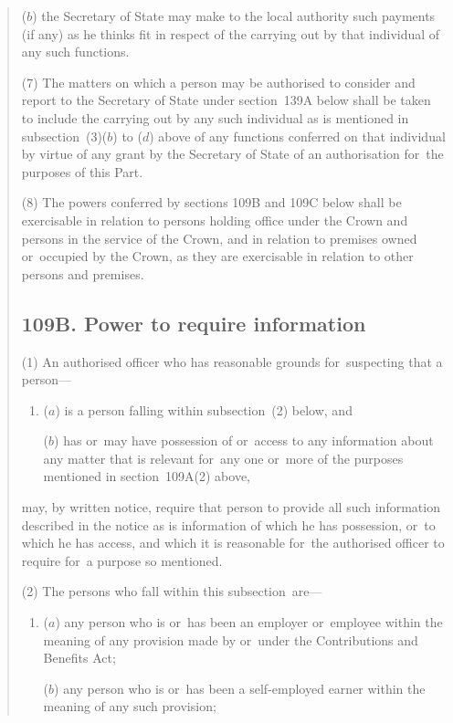 \documentclass[12pt,a4paper]{article}
\begin{document}
\begin{quotation}
\begin{enumerate}
($b$) the Secretary of State may make to the local authority such payments (if any) as he thinks fit in respect of the carrying out by that individual of any such functions.
\end{enumerate}

(7) The matters on which a person may be authorised to consider and report to the Secretary of State under section~139A below shall be taken to include the carrying out by any such individual as is mentioned in subsection~(3)($b$)  to ($d$)  above of any functions conferred on that individual by virtue of any grant by the Secretary of State of an authorisation for~the purposes of this Part.

(8) The powers conferred by sections 109B and 109C below shall be exercisable in relation to persons holding office under the Crown and persons in the service of the Crown, and in relation to premises owned or~occupied by the Crown, as they are exercisable in relation to other persons and premises.

\subsection*{109B. Power to require information}

(1) An authorised officer who has reasonable grounds for~suspecting that a person—
\begin{enumerate}\item[]
($a$) is a person falling within subsection~(2)  below, and

($b$) has or~may have possession of or~access to any information about any matter that is relevant for~any one or~more of the purposes mentioned in section~109A(2)  above,
\end{enumerate}
may, by written notice, require that person to provide all such information described in the notice as is information of which he has possession, or~to which he has access, and which it is reasonable for~the authorised officer to require for~a purpose so mentioned.

(2) The persons who fall within this subsection~are—
\begin{enumerate}\item[]
($a$) any person who is or~has been an employer or~employee within the meaning of any provision made by or~under the Contributions and Benefits Act;

($b$) any person who is or~has been a self-employed earner within the meaning of any such provision;


\end{enumerate}
\end{quotation}
\end{document}
